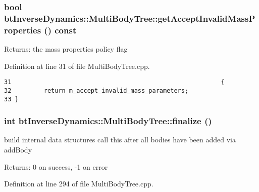 \hypertarget{classbt_inverse_dynamics_1_1_multi_body_tree_ea23f21f50889b30dbf41ad57957dcee}{
\subsubsection[getAcceptInvalidMassProperties]{\setlength{\rightskip}{0pt plus 5cm}bool btInverseDynamics::MultiBodyTree::getAcceptInvalidMassProperties () const}}
\label{classbt_inverse_dynamics_1_1_multi_body_tree_ea23f21f50889b30dbf41ad57957dcee}


\begin{Desc}
\item[Returns:]the mass properties policy flag \end{Desc}


Definition at line 31 of file MultiBodyTree.cpp.

\begin{Code}\begin{verbatim}31                                                          {
32         return m_accept_invalid_mass_parameters;
33 }
\end{verbatim}
\end{Code}


\hypertarget{classbt_inverse_dynamics_1_1_multi_body_tree_c82772ed5bebb1edd6513c03ebd719c2}{
\subsubsection[finalize]{\setlength{\rightskip}{0pt plus 5cm}int btInverseDynamics::MultiBodyTree::finalize ()}}
\label{classbt_inverse_dynamics_1_1_multi_body_tree_c82772ed5bebb1edd6513c03ebd719c2}


build internal data structures call this after all bodies have been added via addBody \begin{Desc}
\item[Returns:]0 on success, -1 on error \end{Desc}


Definition at line 294 of file MultiBodyTree.cpp.


